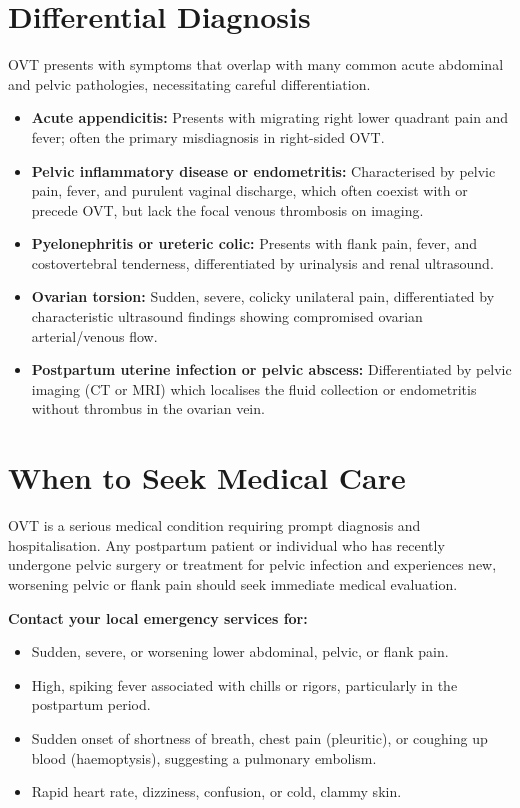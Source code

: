 \section*{Differential Diagnosis}
OVT presents with symptoms that overlap with many common acute abdominal and pelvic pathologies, necessitating careful differentiation.

\begin{itemize}
    \item \textbf{Acute appendicitis:} Presents with migrating right lower quadrant pain and fever; often the primary misdiagnosis in right-sided OVT.
    \item \textbf{Pelvic inflammatory disease or endometritis:} Characterised by pelvic pain, fever, and purulent vaginal discharge, which often coexist with or precede OVT, but lack the focal venous thrombosis on imaging.
    \item \textbf{Pyelonephritis or ureteric colic:} Presents with flank pain, fever, and costovertebral tenderness, differentiated by urinalysis and renal ultrasound.
    \item \textbf{Ovarian torsion:} Sudden, severe, colicky unilateral pain, differentiated by characteristic ultrasound findings showing compromised ovarian arterial/venous flow.
    \item \textbf{Postpartum uterine infection or pelvic abscess:} Differentiated by pelvic imaging (CT or MRI) which localises the fluid collection or endometritis without thrombus in the ovarian vein.
\end{itemize}

\section*{When to Seek Medical Care}
OVT is a serious medical condition requiring prompt diagnosis and hospitalisation. Any postpartum patient or individual who has recently undergone pelvic surgery or treatment for pelvic infection and experiences new, worsening pelvic or flank pain should seek immediate medical evaluation.

\textbf{Contact your local emergency services for:}
\begin{itemize}
    \item Sudden, severe, or worsening lower abdominal, pelvic, or flank pain.
    \item High, spiking fever associated with chills or rigors, particularly in the postpartum period.
    \item Sudden onset of shortness of breath, chest pain (pleuritic), or coughing up blood (haemoptysis), suggesting a pulmonary embolism.
    \item Rapid heart rate, dizziness, confusion, or cold, clammy skin.
\end{itemize}

